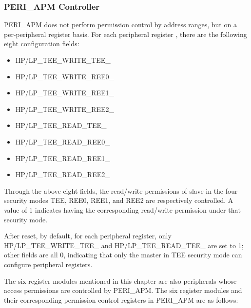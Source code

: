 \documentclass[main\_\_EN.tex]{subfiles}
\begin{document}
\subsubsection{PERI\_APM Controller}

PERI\_APM does not perform permission control by address ranges, but on a per-peripheral register basis. For each peripheral register , there are the following eight configuration fields:

\begin{itemize}
    \item HP/LP\_TEE\_WRITE\_TEE\_
    \item HP/LP\_TEE\_WRITE\_REE0\_
    \item HP/LP\_TEE\_WRITE\_REE1\_
    \item HP/LP\_TEE\_WRITE\_REE2\_
    \item HP/LP\_TEE\_READ\_TEE\_
    \item HP/LP\_TEE\_READ\_REE0\_
    \item HP/LP\_TEE\_READ\_REE1\_
    \item HP/LP\_TEE\_READ\_REE2\_
\end{itemize}

Through the above eight fields, the read/write permissions of slave  in the four security modes TEE, REE0, REE1, and REE2 are respectively controlled. A value of 1 indicates having the corresponding read/write permission under that security mode.

After reset, by default, for each peripheral register, only HP/LP\_TEE\_WRITE\_TEE\_ and HP/LP\_TEE\_READ\_TEE\_ are set to 1; other fields are all 0, indicating that only the master in TEE security mode can configure peripheral registers.

The six register modules mentioned in this chapter are also peripherals whose access permissions are controlled by PERI\_APM. The six register modules and their corresponding permission control registers in PERI\_APM are as follows:
\end{document}
